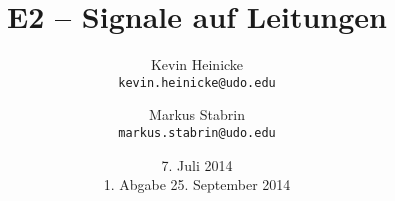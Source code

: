 

\usepackage[europeanresistors]{circuitikz}


\title{%
    E2 -- Signale auf Leitungen
}
\author{%
    Kevin Heinicke\\
    \texttt{kevin.heinicke@udo.edu}
    \and
    Markus Stabrin\\
    \texttt{markus.stabrin@udo.edu}
}
\date{%
    7. Juli 2014\\
    {\small 1. Abgabe} 25. September 2014
}

    \maketitle%
    \tableofcontents
    \newpage

    
    

    \printbibliography

